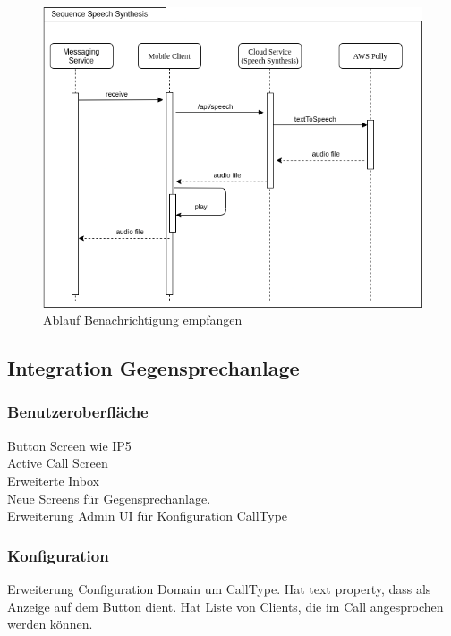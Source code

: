 \begin{figure}[h]
    \centering
    \begin{minipage}[b]{0.9\textwidth}
        \includegraphics[width=\textwidth]{graphics/diagramms/Sequence_Speech_Synth_V01}
        \caption{Ablauf Benachrichtigung empfangen}
    \end{minipage}
\end{figure}

\clearpage

\subsection{Integration Gegensprechanlage}

\subsubsection*{Benutzeroberfläche}

Button Screen wie IP5 \\
Active Call Screen \\
Erweiterte Inbox \\
Neue Screens für Gegensprechanlage. \\
Erweiterung Admin UI für Konfiguration CallType \\


\subsubsection*{Konfiguration}
Erweiterung Configuration Domain um CallType.
Hat text property, dass als Anzeige auf dem Button dient.
Hat Liste von Clients, die im Call angesprochen werden können.

